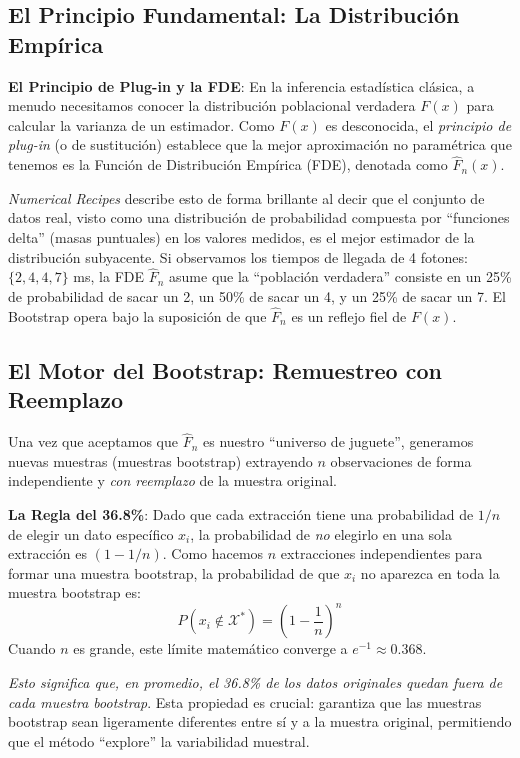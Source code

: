 \documentclass[a4paper]{article}
\begin{document}
\subsection{El Principio Fundamental: La Distribución Empírica}

\textbf{El Principio de Plug-in y la FDE}: En la inferencia estadística clásica, a menudo necesitamos conocer la distribución poblacional verdadera $F(x)$ para calcular la varianza de un estimador. Como $F(x)$ es desconocida, el \textit{principio de plug-in} (o de sustitución) establece que la mejor aproximación no paramétrica que tenemos es la Función de Distribución Empírica (FDE), denotada como $\hat{F}_n(x)$. 

\textit{Numerical Recipes} describe esto de forma brillante al decir que el conjunto de datos real, visto como una distribución de probabilidad compuesta por ``funciones delta'' (masas puntuales) en los valores medidos, es el mejor estimador de la distribución subyacente. Si observamos los tiempos de llegada de 4 fotones: $\{2, 4, 4, 7\}$ ms, la FDE $\hat{F}_n$ asume que la ``población verdadera'' consiste en un 25\% de probabilidad de sacar un 2, un 50\% de sacar un 4, y un 25\% de sacar un 7. El Bootstrap opera bajo la suposición de que $\hat{F}_n$ es un reflejo fiel de $F(x)$.

\subsection{El Motor del Bootstrap: Remuestreo con Reemplazo}

Una vez que aceptamos que $\hat{F}_n$ es nuestro ``universo de juguete'', generamos nuevas muestras (muestras bootstrap) extrayendo $n$ observaciones de forma independiente y \textit{con reemplazo} de la muestra original.

\textbf{La Regla del 36.8\%}:
Dado que cada extracción tiene una probabilidad de $1/n$ de elegir un dato específico $x_i$, la probabilidad de \textit{no} elegirlo en una sola extracción es $(1 - 1/n)$. Como hacemos $n$ extracciones independientes para formar una muestra bootstrap, la probabilidad de que $x_i$ no aparezca en toda la muestra bootstrap es:
$$ P(x_i \notin \mathcal{X}^*) = \left(1 - \frac{1}{n}\right)^n $$
Cuando $n$ es grande, este límite matemático converge a $e^{-1} \approx 0.368$. 

\textit{Esto significa que, en promedio, el 36.8\% de los datos originales quedan fuera de cada muestra bootstrap}. Esta propiedad es crucial: garantiza que las muestras bootstrap sean ligeramente diferentes entre sí y a la muestra original, permitiendo que el método ``explore'' la variabilidad muestral.
\end{document}
